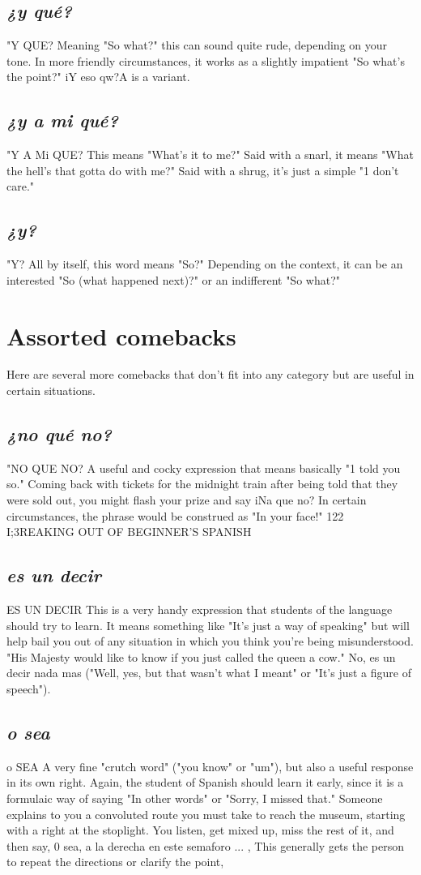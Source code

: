 \documentclass[14pt,a4paper,oneside]{memoir}
\begin{document}
\subsection{\emph{¿y qué?}}
"Y QUE?
Meaning "So what?" this can sound quite rude, depending on
your tone. In more friendly circumstances, it works as a slightly impatient "So what's the point?" iY eso qw?A is a variant.
\subsection{\emph{¿y a mi qué?}}
"Y A Mi QUE?
This means "What's it to me?" Said with a snarl, it means
"What the hell's that gotta do with me?" Said with a shrug, it's just a
simple "1 don't care."
\subsection{\emph{¿y?}}
"Y?
All by itself, this word means "So?" Depending on the context,
it can be an interested "So (what happened next)?" or an indifferent
"So what?"
\section{Assorted comebacks}
Here are several more comebacks that don't fit into any category but are useful in certain situations.
\subsection{\emph{¿no qué no?}}
"NO QUE NO?
A useful and cocky expression that means basically "1 told you
so." Coming back with tickets for the midnight train after being told
that they were sold out, you might flash your prize and say iNa que
no? In certain circumstances, the phrase would be construed as "In
your face!"
122 I;3REAKING OUT OF BEGINNER'S SPANISH
\subsection{\emph{es un decir}}
ES UN DECIR
This is a very handy expression that students of the language
should try to learn. It means something like "It's just a way of speaking" but will help bail you out of any situation in which you think
you're being misunderstood. "His Majesty would like to know if you
just called the queen a cow." No, es un decir nada mas ("Well, yes, but
that wasn't what I meant" or "It's just a figure of speech").
\subsection{\emph{o sea}}
o SEA
A very fine "crutch word" ("you know" or "um"), but also a
useful response in its own right. Again, the student of Spanish should
learn it early, since it is a formulaic way of saying "In other words" or
"Sorry, I missed that." Someone explains to you a convoluted route
you must take to reach the museum, starting with a right at the stoplight. You listen, get mixed up, miss the rest of it, and then say, 0 sea,
a la derecha en este semaforo ... , This generally gets the person to
repeat the directions or clarify the point,
\end{document}
